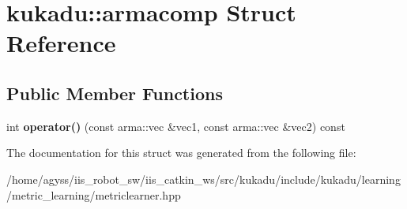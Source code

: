\hypertarget{structkukadu_1_1armacomp}{}\section{kukadu\+:\+:armacomp Struct Reference}
\label{structkukadu_1_1armacomp}
\subsection*{Public Member Functions}
\begin{DoxyCompactItemize}
\item 
int {\bfseries operator()} (const arma\+::vec \&vec1, const arma\+::vec \&vec2) const \hypertarget{structkukadu_1_1armacomp_ae171e976c645755c8b316d864f778c5e}{}\label{structkukadu_1_1armacomp_ae171e976c645755c8b316d864f778c5e}

\end{DoxyCompactItemize}


The documentation for this struct was generated from the following file\+:\begin{DoxyCompactItemize}
\item 
/home/agyss/iis\+\_\+robot\+\_\+sw/iis\+\_\+catkin\+\_\+ws/src/kukadu/include/kukadu/learning/metric\+\_\+learning/metriclearner.\+hpp\end{DoxyCompactItemize}
